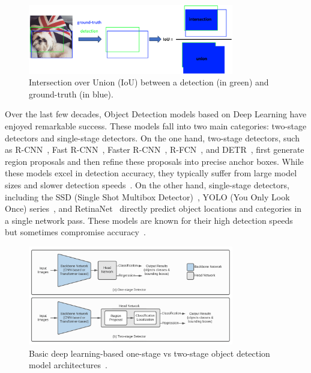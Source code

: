 \documentclass[12pt,oneside]{book} %
\begin{document}
\begin{figure}[H]
    \centering
    \includegraphics[width=0.8\textwidth]{figures/iou.png}
    \caption{Intersection over Union (IoU) between a detection (in green) and ground-truth (in blue).~\cite{huggingface2023objectdetection}}\label{fig:iou-metric}
\end{figure}

Over the last few decades, Object Detection models based on Deep Learning have
enjoyed remarkable success. These models fall into two main categories:
two-stage detectors and single-stage detectors. On the one hand, two-stage
detectors, such as R-CNN~\cite{DBLP:journals/corr/GirshickDDM13}, Fast
R-CNN~\cite{DBLP:journals/corr/Girshick15}, Faster R-CNN~\cite{Ren2017},
R-FCN~\cite{DBLP:journals/corr/DaiLHS16}, and DETR~\cite{Carion2020}, first
generate region proposals and then refine these proposals into precise anchor
boxes. While these models excel in detection accuracy, they typically suffer
from large model sizes and slower detection speeds~\cite{SurveyDLOD,
    ODNetworkUAVCNNTransformer}. On the other hand, single-stage detectors,
including the SSD (Single Shot Multibox
Detector)~\cite{DBLP:journals/corr/LiuAESR15}, YOLO (You Only Look Once)
series~\cite{DBLP:journals/corr/RedmonDGF15, DBLP:journals/corr/RedmonF16,
    DBLP:journals/corr/abs-2004-10934, chen2023yoloms,
    DBLP:journals/corr/abs-2107-08430, YOLOv5Release, li2023yolov6, YOLOv8,
    wang2024yolov9, xu2022ppyoloe, wang2023goldyolo, xu2023damoyolo,
    wang2024yolov10}, and RetinaNet~\cite{lin2018focal} directly predict object
locations and categories in a single network pass. These models are known for
their high detection speeds but sometimes compromise accuracy~\cite{SurveyDLOD,
    ODNetworkUAVCNNTransformer, Diwan2023}.

\begin{figure}[H]
    \centering
    \includegraphics[width=0.8\textwidth]{figures/one-stage_two-stage_OD.png}
    \caption{Basic deep learning-based one-stage vs two-stage object detection model architectures~\cite{SurveyDLOD}.}\label{fig:two-stage-vs-single-stage}
\end{figure}
\end{document}
